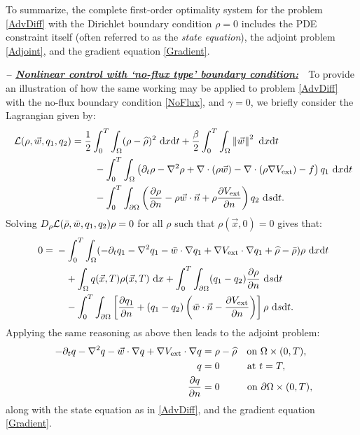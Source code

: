 To summarize, the complete first-order optimality system for the problem \eqref{AdvDiff} with the Dirichlet boundary condition $\rho=0$ includes the PDE constraint itself (often referred to as the \emph{state equation}), the adjoint problem \eqref{Adjoint}, and the gradient equation \eqref{Gradient}.

\vspace{0.75em}

\textbf{\emph{-- \underline{Nonlinear control with `no-flux type' boundary condition:}}}~~To provide an illustration of how the same working may be applied to problem \eqref{AdvDiff} with the no-flux boundary condition \eqref{NoFlux}, and $\gamma = 0$, we briefly consider the Lagrangian given by:
\begin{align*}
\ \mathcal{L}(\rho,\vec{w},\adj_1,\adj_2)={}&\frac{1}{2}\int_0^T\int_{\Omega}(\rho-\widehat{\rho})^2~{\rm d}x{\rm d}t+\frac{\beta}{2}\int_0^T\int_{\Omega}\left\|\vec{w}\right\|^2~{\rm d}x{\rm d}t \\
\ &\quad-\int_0^T\int_{\Omega}\left(\partial_{t}\rho-\nabla^{2}\rho+\nabla\cdot(\rho\vec{w})-\nabla\cdot(\rho\nabla{}V_{\text{ext}})-f\right)\adj_1~{\rm d}x{\rm d}t \\
\ &\quad-\int_0^T\int_{\partial\Omega}\left(\frac{\partial\rho}{\partial{}n}-\rho\vec{w}\cdot\vec{n}+\rho\frac{\partial{}V_{\text{ext}}}{\partial{}n}\right)\adj_2~{\rm d}s{\rm d}t.
\end{align*}
Solving $D_{\rho}\mathcal{L}(\bar{\rho},\bar{w},q_1,q_2)\rho=0$ for all $\rho$ such that $\rho(\vec{x},0)=0$ gives that:
\begin{align*}
\ 0={}&-\int_0^T\int_{\Omega}(-\partial_{t}\adj_{1}-\nabla^{2}\adj_{1}-\bar{w}\cdot\nabla{}\adj_{1}+\nabla{}V_{\text{ext}}\cdot\nabla{}\adj_{1}+\widehat{\rho}-\bar{\rho})\rho~{\rm d}x{\rm d}t \\
\ &\quad+\int_{\Omega}\adj(\vec{x},T)\rho(\vec{x},T)~{\rm d}x+\int_0^T\int_{\partial\Omega}(\adj_1-\adj_2)\frac{\partial\rho}{\partial{}n}~{\rm d}s{\rm d}t \\
\ &\quad-\int_0^T\int_{\partial\Omega}\left[\frac{\partial{}\adj_1}{\partial{}n}+(\adj_{1}-\adj_{2})\left(\bar{w}\cdot\vec{n}-\frac{\partial{}V_{\text{ext}}}{\partial{}n}\right)\right]\rho~{\rm d}s{\rm d}t.
\end{align*}
Applying the same reasoning as above then leads to the adjoint problem:
\begin{align}
\ \label{Adjoint_NoFlux} -\partial_{t}\adj-\nabla^{2}\adj-\vec{w}\cdot\nabla{}\adj+\nabla{}V_{\text{ext}}\cdot\nabla{}\adj={}&\rho-\widehat{\rho}\quad\text{on }\Omega\times(0,T), \\
\ \nonumber \adj={}&0\quad\hspace{1.8em}\text{at }t=T, \\
\ \nonumber \frac{\partial{}\adj}{\partial{}n}={}&0\quad\hspace{1.8em}\text{on }\partial\Omega\times(0,T),
\end{align}
along with the state equation as in \eqref{AdvDiff}, and the gradient equation \eqref{Gradient}.

